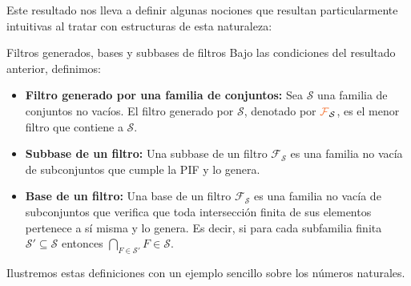 \documentclass[titlepage,11pt,a4paper]{book}
\newcommand{\filt}{\ensuremath{\textcolor{Orange}{\mathcal{F}}}}
\begin{document}
Este resultado nos lleva a definir algunas nociones que resultan particularmente intuitivas al tratar con estructuras de esta naturaleza:

\begin{defn*}{Filtros generados, bases y subbases de filtros}
    Bajo las condiciones del resultado anterior, definimos:
    \begin{itemize}
        \item \textbf{Filtro generado por una familia de conjuntos:} Sea $\mathcal S$ una familia de conjuntos no vacíos. El filtro generado por $\mathcal S$, denotado por $\filt_{\mathcal S}$, es el menor filtro que contiene a $\mathcal S$.
        \item \textbf{Subbase de un filtro:} Una subbase de un filtro $\mathcal F_{\mathcal S}$ es una familia no vacía de subconjuntos que cumple la PIF y lo genera.
        \item \textbf{Base de un filtro:} Una base de un filtro $\mathcal F_{\mathcal S}$  es una familia no vacía de subconjuntos que verifica que toda intersección finita de sus elementos pertenece a sí misma y lo genera. Es decir, si para cada subfamilia finita 
        $\mathcal S' \subseteq \mathcal S$ entonces $\bigcap_{F \in \mathcal S'} F \in \mathcal S$.
    \end{itemize}
\end{defn*}

Ilustremos estas definiciones con un ejemplo sencillo sobre los números naturales.
\end{document}
